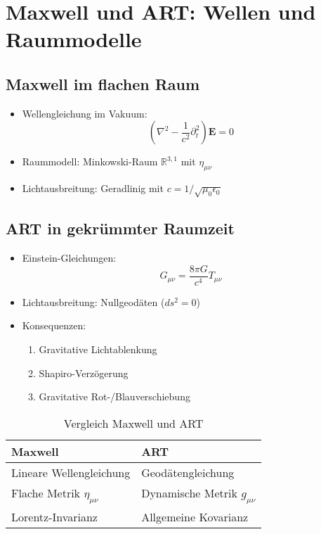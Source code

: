 \section{Maxwell und ART: Wellen und Raummodelle}

\subsection{Maxwell im flachen Raum}
\begin{itemize}[leftmargin=*,noitemsep]
    \item Wellengleichung im Vakuum:
    \begin{equation}
    \left(\nabla^2 - \frac{1}{c^2}\partial_t^2\right)\bm{E} = 0
    \end{equation}
    \item Raummodell: Minkowski-Raum $\mathbb{R}^{3,1}$ mit $\eta_{\mu\nu}$
    \item Lichtausbreitung: Geradlinig mit $c = 1/\sqrt{\mu_0\epsilon_0}$
\end{itemize}

\subsection{ART in gekrümmter Raumzeit}
\begin{itemize}[leftmargin=*,noitemsep]
    \item Einstein-Gleichungen:
    \begin{equation}
    G_{\mu\nu} = \frac{8\pi G}{c^4}T_{\mu\nu}
    \end{equation}
    \item Lichtausbreitung: Nullgeodäten ($ds^2 = 0$)
    \item Konsequenzen:
    \begin{enumerate}[noitemsep]
        \item Gravitative Lichtablenkung
        \item Shapiro-Verzögerung
        \item Gravitative Rot-/Blauverschiebung
    \end{enumerate}
\end{itemize}

\begin{table}[h]
\centering
\caption{Vergleich Maxwell und ART}
\begin{tabular}{ll}
\toprule
\textbf{Maxwell} & \textbf{ART} \\
\midrule
Lineare Wellengleichung & Geodätengleichung \\
Flache Metrik $\eta_{\mu\nu}$ & Dynamische Metrik $g_{\mu\nu}$ \\
Lorentz-Invarianz & Allgemeine Kovarianz \\
\bottomrule
\end{tabular}
\end{table}

